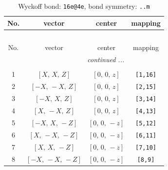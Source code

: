 \documentclass[fleqn,8pt]{jsarticle}
\begin{document}
\begin{longtable}{cccc}
\caption{Wyckoff bond: {\tt 16e@4e}, bond symmetry: {\tt ..m}}
 \\
 \hline \hline
No. & vector & center & mapping \\ \hline \endfirsthead

\multicolumn{3}{l}{\tablename\ \thetable{}} \\
 \hline \hline
No. & vector & center & mapping \\ \hline \endhead

 \hline \hline
\multicolumn{3}{r}{\footnotesize\it continued ...} \\ \endfoot

 \hline \hline
\multicolumn{3}{r}{} \\ \endlastfoot

1 & $\left[ X,\, X,\, Z \right]$ & $\left[ 0,\, 0,\, z \right]$ & {\tt [1,16]} \\ \hline
2 & $\left[ - X,\, - X,\, Z \right]$ & $\left[ 0,\, 0,\, z \right]$ & {\tt [2,15]} \\ \hline
3 & $\left[ - X,\, X,\, Z \right]$ & $\left[ 0,\, 0,\, z \right]$ & {\tt [3,14]} \\ \hline
4 & $\left[ X,\, - X,\, Z \right]$ & $\left[ 0,\, 0,\, z \right]$ & {\tt [4,13]} \\ \hline
5 & $\left[ - X,\, X,\, - Z \right]$ & $\left[ 0,\, 0,\, - z \right]$ & {\tt [5,12]} \\ \hline
6 & $\left[ X,\, - X,\, - Z \right]$ & $\left[ 0,\, 0,\, - z \right]$ & {\tt [6,11]} \\ \hline
7 & $\left[ X,\, X,\, - Z \right]$ & $\left[ 0,\, 0,\, - z \right]$ & {\tt [7,10]} \\ \hline
8 & $\left[ - X,\, - X,\, - Z \right]$ & $\left[ 0,\, 0,\, - z \right]$ & {\tt [8,9]} \\
\end{longtable}
\renewcommand{\arraystretch}{1.2}
\end{document}
